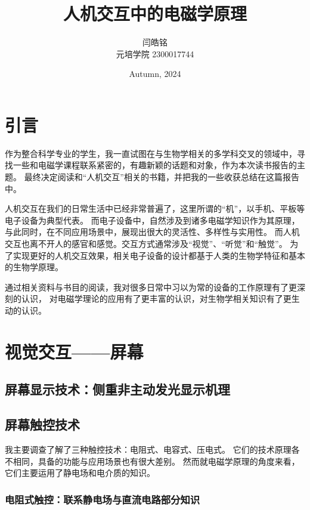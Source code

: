 \documentclass[UTF-8]{ctexart}
\title{人机交互中的电磁学原理}
\author{闫皓铭 \\ 元培学院 2300017744}
\date{Autumn, 2024}
\begin{document}
\maketitle

\section{引言}
作为整合科学专业的学生，我一直试图在与生物学相关的多学科交叉的领域中，寻找一些和电磁学课程联系紧密的，有趣新颖的话题和对象，作为本次读书报告的主题。
最终决定阅读和“人机交互”相关的书籍，并把我的一些收获总结在这篇报告中。

人机交互在我们的日常生活中已经非常普遍了，这里所谓的“机”，以手机、平板等电子设备为典型代表。
而电子设备中，自然涉及到诸多电磁学知识作为其原理，与此同时，在不同应用场景中，展现出很大的灵活性、多样性与实用性。
而人机交互也离不开人的感官和感觉。交互方式通常涉及“视觉”、“听觉”和“触觉”。
为了实现更好的人机交互效果，相关电子设备的设计都基于人类的生物学特征和基本的生物学原理。

通过相关资料与书目的阅读，我对很多日常中习以为常的设备的工作原理有了更深刻的认识，
对电磁学理论的应用有了更丰富的认识，对生物学相关知识有了更生动的认识。
\section{视觉交互——屏幕} 
\subsection{屏幕显示技术：侧重非主动发光显示机理}

\subsection{屏幕触控技术}
我主要调查了解了三种触控技术：电阻式、电容式、压电式。
它们的技术原理各不相同，具备的功能与应用场景也有很大差别。
然而就电磁学原理的角度来看，它们主要运用了静电场和电介质的知识。
\subsubsection{电阻式触控：联系静电场与直流电路部分知识}
\end{document}
